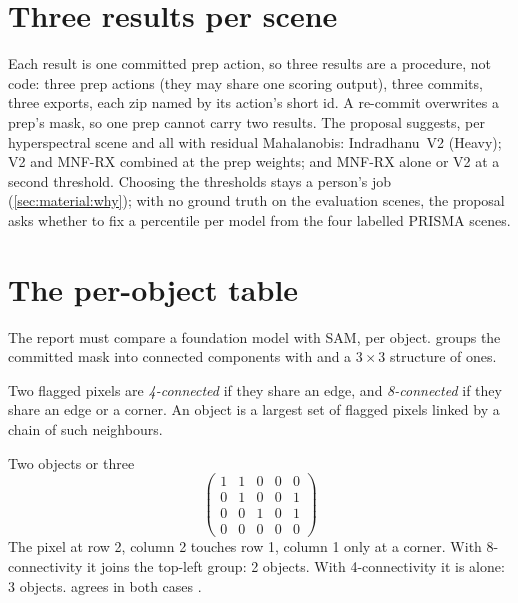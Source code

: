 \section{Three results per scene}\label{sec:submission:three}

Each result is one committed prep action, so three results are a procedure, not code: three prep actions (they may
share one scoring output), three commits, three exports, each zip named by its action's short id. A re-commit overwrites
a prep's mask, so one prep cannot carry two results. The proposal suggests, per hyperspectral scene and all with
residual Mahalanobis: Indradhanu~V2 (Heavy); V2 and MNF-RX combined at the prep weights; and MNF-RX alone or V2 at a
second threshold. Choosing the thresholds stays a person's job (\cref{sec:material:why}); with no ground truth on the
evaluation scenes, the proposal asks whether to fix a percentile per model from the four labelled PRISMA scenes.

\section{The per-object table}\label{sec:submission:objects}

The report must compare a foundation model with SAM, per object.  groups the
committed mask into connected components with  and a $3\times3$ structure of ones.

\begin{definition}
Two flagged pixels are \emph{4-connected} if they share an edge, and \emph{8-connected} if they share
an edge or a corner. An object is a largest set of flagged pixels linked by a chain of such neighbours.
\end{definition}

\begin{worked}[label={we:submission:components}]{Two objects or three}
\[
\begin{pmatrix}1&1&0&0&0\\0&1&0&0&1\\0&0&1&0&1\\0&0&0&0&0\end{pmatrix}
\]
The pixel at row 2, column 2 touches row 1, column 1 only at a corner. With 8-connectivity it joins the top-left group:
2 objects. With 4-connectivity it is alone: 3 objects.  agrees in both cases \tagC.
\end{worked}

